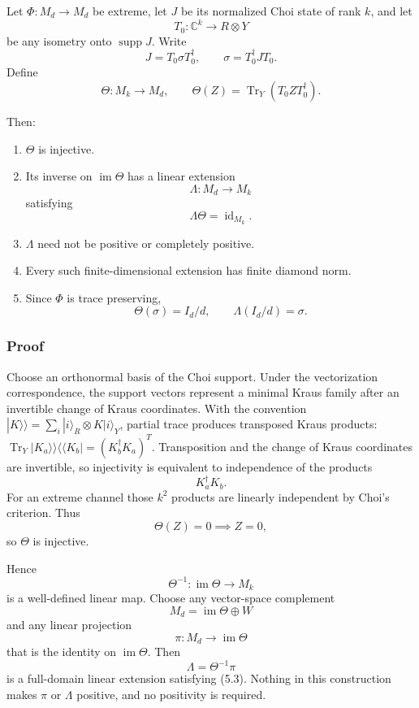 \documentclass[11pt,a4paper]{article}
\providecommand{\tightlist}{\setlength{\itemsep}{0pt}\setlength{\parskip}{0pt}}
\numberwithin{equation}{section}
\begin{document}
Let \(\Phi:M_d\to M_d\) be extreme, let \(J\) be its normalized Choi
state of rank \(k\), and let \[
T_0:\mathbb C^k\to R\otimes Y
\] be any isometry onto \(\operatorname{supp}J\). Write \[
J=T_0\sigma T_0^\dagger,
\qquad
\sigma=T_0^\dagger JT_0.
\tag{5.1}
\] Define \[
\Theta:M_k\to M_d,
\qquad
\Theta(Z)=\operatorname{Tr}_Y(T_0ZT_0^\dagger).
\tag{5.2}
\]

Then:

\begin{enumerate}
\def\labelenumi{\arabic{enumi}.}
\tightlist
\item
  \(\Theta\) is injective.
\item
  Its inverse on \(\operatorname{im}\Theta\) has a linear extension \[
  \Lambda:M_d\to M_k
  \] satisfying \[
  \Lambda\Theta=\operatorname{id}_{M_k}.
  \tag{5.3}
  \]
\item
  \(\Lambda\) need not be positive or completely positive.
\item
  Every such finite-dimensional extension has finite diamond norm.
\item
  Since \(\Phi\) is trace preserving, \[
  \Theta(\sigma)=I_d/d,
  \qquad
  \Lambda(I_d/d)=\sigma.
  \tag{5.4}
  \]
\end{enumerate}

\subsubsection{Proof}\label{proof-5}

Choose an orthonormal basis of the Choi support. Under the vectorization
correspondence, the support vectors represent a minimal Kraus family
after an invertible change of Kraus coordinates. With the convention
\(|K\rangle\!\rangle=\sum_i|i\rangle_R\otimes K|i\rangle_Y\), partial
trace produces transposed Kraus products:
\(\operatorname{Tr}_Y|K_a\rangle\!\rangle\langle\!\langle K_b|=(K_b^\dagger K_a)^T\).
Transposition and the change of Kraus coordinates are invertible, so
injectivity is equivalent to independence of the products \[
K_a^\dagger K_b.
\] For an extreme channel those \(k^2\) products are linearly
independent by Choi's criterion. Thus \[
\Theta(Z)=0\implies Z=0,
\] so \(\Theta\) is injective.

Hence \[
\Theta^{-1}:\operatorname{im}\Theta\to M_k
\] is a well-defined linear map. Choose any vector-space complement \[
M_d=\operatorname{im}\Theta\oplus W
\] and any linear projection \[
\pi:M_d\to\operatorname{im}\Theta
\] that is the identity on \(\operatorname{im}\Theta\). Then \[
\Lambda=\Theta^{-1}\pi
\] is a full-domain linear extension satisfying (5.3). Nothing in this
construction makes \(\pi\) or \(\Lambda\) positive, and no positivity is
required.
\end{document}
